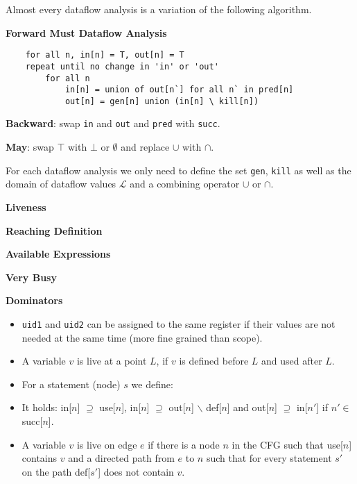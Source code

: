 Almost every dataflow analysis is a variation of the following algorithm. \smallskip

\textbf{Forward Must Dataflow Analysis}
\begin{lstlisting}
	for all n, in[n] = T, out[n] = T
	repeat until no change in 'in' or 'out'
		for all n
			in[n] = union of out[n`] for all n` in pred[n]
			out[n] = gen[n] union (in[n] \ kill[n])	
\end{lstlisting}\medskip

\textbf{Backward}: swap \texttt{in} and \texttt{out} and \texttt{pred} with \texttt{succ}.\medskip

\textbf{May}: swap $\top$ with $\bot$ or $\emptyset$ and replace $\cup$ with $\cap$. \medskip

For each dataflow analysis we only need to define the set \texttt{gen}, \texttt{kill} as well as the domain of dataflow values $\mathcal L$ and a combining operator $\cup$ or $\cap$.\medskip

\textbf{Liveness}\medskip



\textbf{Reaching Definition}\medskip



\textbf{Available Expressions}\medskip



\textbf{Very Busy}\medskip



\textbf{Dominators}\medskip




\begin{itemize} 
	\item \texttt{uid1} and \texttt{uid2} can be assigned to the same register if their values are not needed at the same time (more fine grained than scope).
	
	\item A variable $v$ is live at a point $L$, if $v$ is defined before $L$ and used after $L$.
		
	\item For a statement (node) $s$ we define: 
	
	\item It holds: in[$n$] $\supseteq$ use[$n$], in[$n$] $\supseteq$ out[$n$] $\backslash$ def[$n$] and out[$n$] $\supseteq$ in[$n'$] if $n' \in $ succ[$n$].
		
	\item A variable $v$ is live on edge $e$ if there is a node $n$ in the CFG such that use[$n$] contains $v$ and a directed path from $e$ to $n$ such that for every statement $s'$ on the path def[$s'$] does not contain $v$.

\end{itemize}


